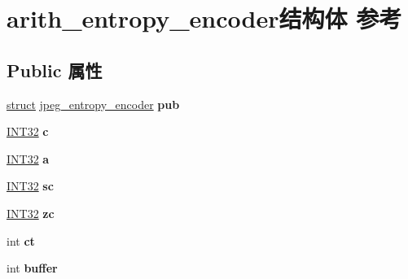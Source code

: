 \hypertarget{structarith__entropy__encoder}{}\section{arith\+\_\+entropy\+\_\+encoder结构体 参考}
\label{structarith__entropy__encoder}
\subsection*{Public 属性}
\begin{DoxyCompactItemize}
\item 
\mbox{\label{structarith__entropy__encoder_adaa616ab2a0f584358f8233775146d68}} 
\hyperlink{interfacestruct}{struct} \hyperlink{structjpeg__entropy__encoder}{jpeg\+\_\+entropy\+\_\+encoder} {\bfseries pub}
\item 
\mbox{\label{structarith__entropy__encoder_a84198956e6633b09fda5713b89164292}} 
\hyperlink{_processor_bind_8h_a1137216524060afd426c34677fed058b}{I\+N\+T32} {\bfseries c}
\item 
\mbox{\label{structarith__entropy__encoder_afdfd4096eabee6a199afe6764b1ea35a}} 
\hyperlink{_processor_bind_8h_a1137216524060afd426c34677fed058b}{I\+N\+T32} {\bfseries a}
\item 
\mbox{\label{structarith__entropy__encoder_aabd22ab89a4d488c9eebb109d91c3655}} 
\hyperlink{_processor_bind_8h_a1137216524060afd426c34677fed058b}{I\+N\+T32} {\bfseries sc}
\item 
\mbox{\label{structarith__entropy__encoder_ad02520a5282d4d042bf39e8a50d6ddf8}} 
\hyperlink{_processor_bind_8h_a1137216524060afd426c34677fed058b}{I\+N\+T32} {\bfseries zc}
\item 
\mbox{\label{structarith__entropy__encoder_af636dab56c69b209b0bb5aefba723e80}} 
int {\bfseries ct}
\item 
\mbox{\label{structarith__entropy__encoder_a404b730ace823b7212e4953146d02159}} 
int {\bfseries buffer}
\item 

\end{DoxyCompactItemize}
